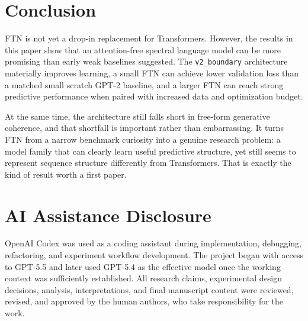 \documentclass[11pt]{article}
\begin{document}
\section{Conclusion}
FTN is not yet a drop-in replacement for Transformers. However, the results in this paper show that an attention-free spectral language model can be more promising than early weak baselines suggested. The \texttt{v2\_boundary} architecture materially improves learning, a small FTN can achieve lower validation loss than a matched small scratch GPT-2 baseline, and a larger FTN can reach strong predictive performance when paired with increased data and optimization budget.

At the same time, the architecture still falls short in free-form generative coherence, and that shortfall is important rather than embarrassing. It turns FTN from a narrow benchmark curiosity into a genuine research problem: a model family that can clearly learn useful predictive structure, yet still seems to represent sequence structure differently from Transformers. That is exactly the kind of result worth a first paper.

\section*{AI Assistance Disclosure}
OpenAI Codex was used as a coding assistant during implementation, debugging, refactoring, and experiment workflow development. The project began with access to GPT-5.5 and later used GPT-5.4 as the effective model once the working context was sufficiently established. All research claims, experimental design decisions, analysis, interpretations, and final manuscript content were reviewed, revised, and approved by the human authors, who take responsibility for the work.
\end{document}
